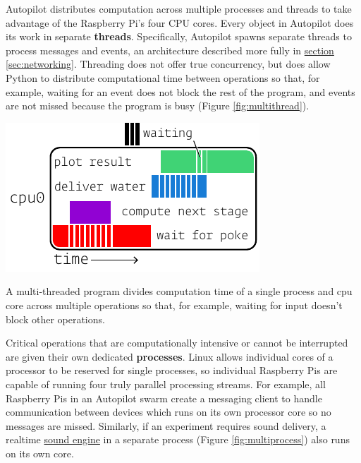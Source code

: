 Autopilot distributes computation across multiple processes and threads to take advantage of the Raspberry Pi's four CPU cores. Every object in Autopilot does its work in separate \textbf{threads}. Specifically, Autopilot spawns separate threads to process messages and events, an architecture described more fully in \hyperref[sec:networking]{section \ref*{sec:networking}}. Threading does not offer true concurrency, but does allow Python to distribute computational time between operations so that, for example, waiting for an event does not block the rest of the program, and events are not missed because the program is busy (Figure \ref{fig:multithread}).

\begin{marginfigure}
\includegraphics[]{figures/side_13_multithread.pdf}
\caption{A multi-threaded program divides computation time of a single process and cpu core across multiple operations so that, for example, waiting for input doesn't block other operations.}
\label{fig:multithread}
\end{marginfigure}

Critical operations that are computationally intensive or cannot be interrupted are given their own dedicated \textbf{processes}. Linux allows individual cores of a processor to be reserved for single processes, so individual Raspberry Pis are capable of running four truly parallel processing streams. For example, all Raspberry Pis in an Autopilot swarm create a messaging client to handle communication between devices which runs on its own processor core so no messages are missed. Similarly, if an experiment requires sound delivery, a realtime \hyperref[sec:stim]{sound engine} in a separate process (Figure \ref{fig:multiprocess}) also runs on its own core.

